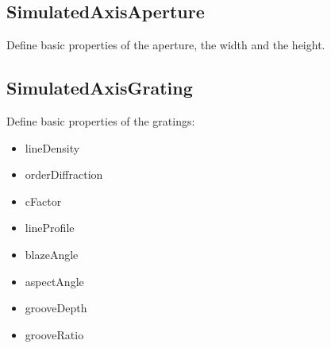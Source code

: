 \documentclass[letterpaper,10pt,english]{sphinxmanual}
\begin{document}
\subsection{SimulatedAxisAperture}
\label{\detokenize{API:simulatedaxisaperture}}

\begin{fulllineitems}
\label{\detokenize{API:raypyng_bluesky.axes.SimulatedAxisAperture}}
\pysigstartsignatures
{}
\pysigstopsignatures
\sphinxAtStartPar
Define basic properties of the aperture,
the width and the height.

\end{fulllineitems}



\subsection{SimulatedAxisGrating}
\label{\detokenize{API:simulatedaxisgrating}}

\begin{fulllineitems}
\label{\detokenize{API:raypyng_bluesky.axes.SimulatedAxisGrating}}
\pysigstartsignatures
{}
\pysigstopsignatures
\sphinxAtStartPar
Define basic properties of the gratings:
\begin{itemize}
\item {} 
\sphinxAtStartPar
lineDensity

\item {} 
\sphinxAtStartPar
orderDiffraction

\item {} 
\sphinxAtStartPar
cFactor

\item {} 
\sphinxAtStartPar
lineProfile

\item {} 
\sphinxAtStartPar
blazeAngle

\item {} 
\sphinxAtStartPar
aspectAngle

\item {} 
\sphinxAtStartPar
grooveDepth

\item {} 
\sphinxAtStartPar
grooveRatio

\end{itemize}

\end{fulllineitems}
\end{document}
